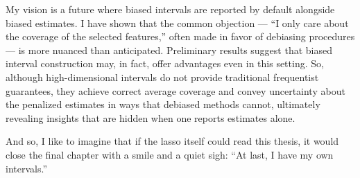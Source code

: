 My vision is a future where biased intervals are reported by default alongside biased estimates. I have shown that the common objection --- ``I only care about the coverage of the selected features,'' often made in favor of debiasing procedures --- is more nuanced than anticipated. Preliminary results suggest that biased interval construction may, in fact, offer advantages even in this setting. So, although high-dimensional intervals do not provide traditional frequentist guarantees, they achieve correct average coverage and convey uncertainty about the penalized estimates in ways that debiased methods cannot, ultimately revealing insights that are hidden when one reports estimates alone.

And so, I like to imagine that if the lasso itself could read this thesis, it would close the final chapter with a smile and a quiet sigh: “At last, I have my own intervals.”